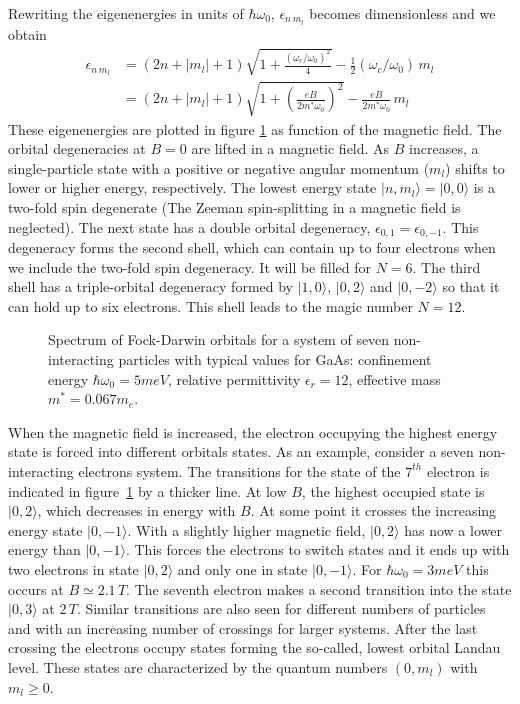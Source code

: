 Rewriting the eigenenergies in units of $\hbar \omega_0$, $\epsilon_{n \, m_l}$ becomes dimensionless and we obtain
\begin{align}
 \epsilon_{n \, m_l} &= (2n+|m_l|+1)  \sqrt{1+\frac{(\omega_c/ \omega_0)^2}{4}} -\frac{1}{2}(\omega_c /\omega_0) \, m_l\\
&= (2n+|m_l|+1)  \sqrt{1+(\frac{e B}{2m^* \omega_0})^2} -\frac{e B}{2m^* \omega_0} \, m_l
\end{align} 
These eigenenergies are plotted in figure \ref{fig:fockDarwin1} as function of the magnetic field. The orbital degeneracies at $B=0$ are lifted in a magnetic field. As $B$ increases, a single-particle state with a positive or negative angular momentum ($m_l$) shifts to lower or higher energy, respectively. The lowest energy state $|n,m_l \rangle=|0,0 \rangle$ is a two-fold spin degenerate (The Zeeman spin-splitting in a magnetic field is neglected). The next state has a double orbital degeneracy, $\epsilon_{0,1}=\epsilon_{0,-1}$. This degeneracy forms the second shell, which can contain up to four electrons when we include the two-fold spin degeneracy. It will be filled for $N=6$. The third shell has a triple-orbital degeneracy formed by $|1,0 \rangle$, $|0,2 \rangle$ and $|0,-2 \rangle$ so that it can hold up to six electrons. This shell leads to the magic number $N=12$.


\begin{figure}
\centering
\scalebox{0.6}{}
\caption{\label{fig:fockDarwin1} Spectrum of Fock-Darwin orbitals for a system of seven non-interacting particles with typical values for GaAs: confinement energy $\hbar \omega_0=5meV$, relative permittivity $\epsilon_r=12$, effective mass $m^*=0.067m_e$.}
\end{figure}

When the magnetic field is increased, the electron occupying the highest energy state is forced into different orbitals states. As an example, consider a seven non-interacting electrons system. The transitions for the state of the $7^{th}$ electron is indicated in figure~\ref{fig:fockDarwin1} by a thicker line. At low $B$, the highest occupied state is $|0,2 \rangle$, which decreases in energy with $B$. At some point it crosses the increasing energy state $|0,-1 \rangle$. With a slightly higher magnetic field, $|0,2 \rangle$ has now a lower energy than $|0,-1 \rangle$. This forces the electrons to switch states and it ends up with two electrons in state $|0,2 \rangle$ and only one in state $|0,-1 \rangle$. For $\hbar \omega_0=3meV$ this occurs at $B\simeq 2.1 \,T$. The seventh electron makes a second transition into the state $|0,3 \rangle$ at $2 \, T$. Similar transitions are also seen for different numbers of particles and with an increasing number of crossings for larger systems. After the last crossing the electrons occupy states forming the so-called, lowest orbital Landau level. These states are characterized by the quantum numbers $(0,m_l)$ with $m_l \geq 0$.

